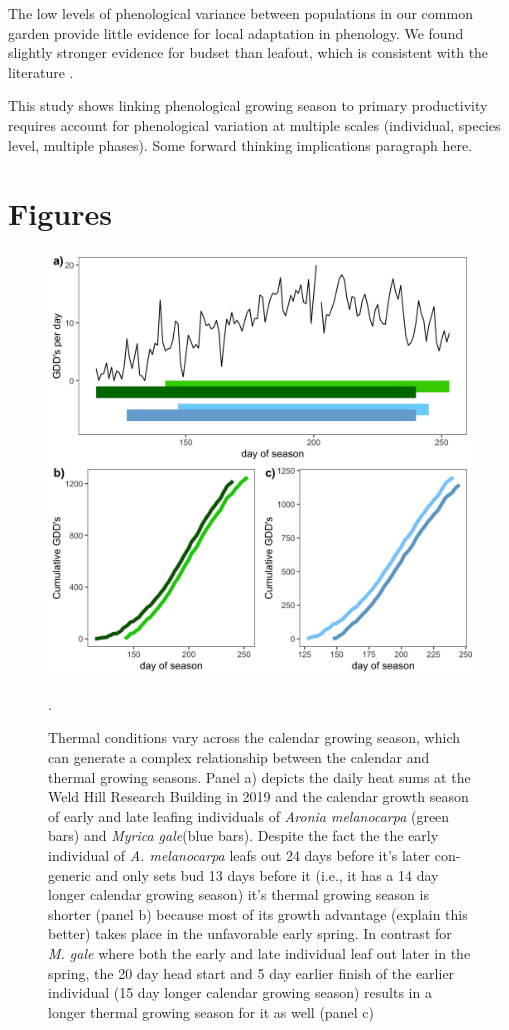 \documentclass[12 pt]{article}
\begin{document}
The low levels of phenological variance between populations in our common garden provide little evidence for local adaptation in phenology. We found slightly stronger evidence for budset than leafout, which is consistent with the literature \citep{}. 

 This study shows linking phenological growing season to primary productivity requires account for phenological variation at multiple scales (individual, species level, multiple phases). Some forward thinking implications paragraph here.


\section{Figures} %
\begin{figure}[h!]
    \centering
 \includegraphics[width=.5\textwidth]{..//analyses/figures/aronia_examp.jpeg}
    \caption{Thermal conditions vary across the calendar growing season, which can generate a complex relationship between the calendar and thermal growing seasons. Panel a) depicts the daily heat sums at the Weld Hill Research Building in 2019 and the calendar growth season of early and late leafing individuals of \emph{Aronia melanocarpa} (green bars) and \emph{Myrica gale}(blue bars). Despite the fact the the early individual of \emph{A. melanocarpa} leafs out 24 days before it's later con-generic and only sets bud 13 days before it (i.e., it has a 14 day longer calendar growing season) it's thermal growing season is shorter (panel b) because most of its growth advantage (explain this better) takes place in the unfavorable early spring. In contrast for \emph{M. gale} where both the early and late individual leaf out later in the spring, the 20 day head start and 5 day earlier finish of the earlier individual (15 day longer calendar growing season) results in a longer thermal growing season for it as well (panel c)}.
    \label{fig:concept}
\end{figure}
\end{document}
